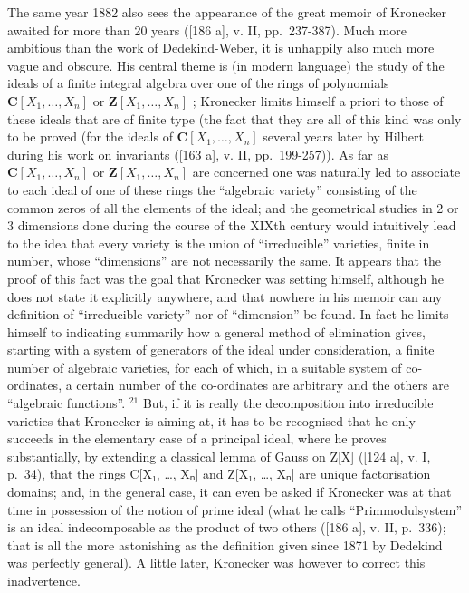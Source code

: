 The same year 1882 also sees the appearance of the great memoir of Kronecker awaited for more than 20 years ({[}186 a{]}, v. II, pp.~237-387). Much more ambitious than the work of Dedekind-Weber, it is unhappily also much more vague and obscure. His central theme is (in modern language) the study of the ideals of a finite integral algebra over one of the rings of polynomials \(\mathbf{C}[X_1,\ldots ,X_n]\) or \(\mathbf{Z}[X_1,\ldots ,X_n]\) ; Kronecker limits himself a priori to those of these ideals that are of finite type (the fact that they are all of this kind was only to be proved (for the ideals of \(\mathbf{C}[X_1,\ldots ,X_n]\) several years later by Hilbert during his work on invariants ({[}163 a{]}, v. II, pp.~199-257)). As far as \(\mathbf{C}[X_1,\ldots ,X_n]\) or \(\mathbf{Z}[X_1,\ldots ,X_n]\) are concerned one was naturally led to associate to each ideal of one of these rings the ``algebraic variety'' consisting of the common zeros of all the elements of the ideal; and the geometrical studies in 2 or 3 dimensions done during the course of the XIXth century would intuitively lead to the idea that every variety is the union of ``irreducible'' varieties, finite in number, whose ``dimensions'' are not necessarily the same. It appears that the proof of this fact was the goal that Kronecker was setting himself, although he does not state it explicitly anywhere, and that nowhere in his memoir can any definition of ``irreducible variety'' nor of ``dimension'' be found. In fact he limits himself to indicating summarily how a general method of elimination gives, starting with a system of generators of the ideal under consideration, a finite number of algebraic varieties, for each of which, in a suitable system of co-ordinates, a certain number of the co-ordinates are arbitrary and the others are ``algebraic functions''. \(^{21}\) But, if it is really the decomposition into irreducible varieties that Kronecker is aiming at, it has to be recognised that he only succeeds in the elementary case of a principal ideal, where he proves substantially, by extending a classical lemma of Gauss on Z{[}X{]} ({[}124 a{]}, v. I, p.~34), that the rings C{[}X₁, \ldots, Xₙ{]} and Z{[}X₁, \ldots, Xₙ{]} are unique factorisation domains; and, in the general case, it can even be asked if Kronecker was at that time in possession of the notion of prime ideal (what he calls ``Primmodulsystem'' is an ideal indecomposable as the product of two others ({[}186 a{]}, v. II, p.~336); that is all the more astonishing as the definition given since 1871 by Dedekind was perfectly general). A little later, Kronecker was however to correct this inadvertence.

